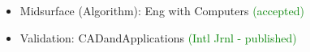 \begin{frame}
\begin{itemize}[noitemsep,label=\textbullet, topsep=2pt,parsep=2pt,partopsep=2pt]
\item  Midsurface (Algorithm): Eng with Computers  \textcolor{green}{(accepted)}
\item  Validation: CADandApplications \textcolor{green}{(Intl Jrnl - published)}
\end{itemize}
\end{frame} 

